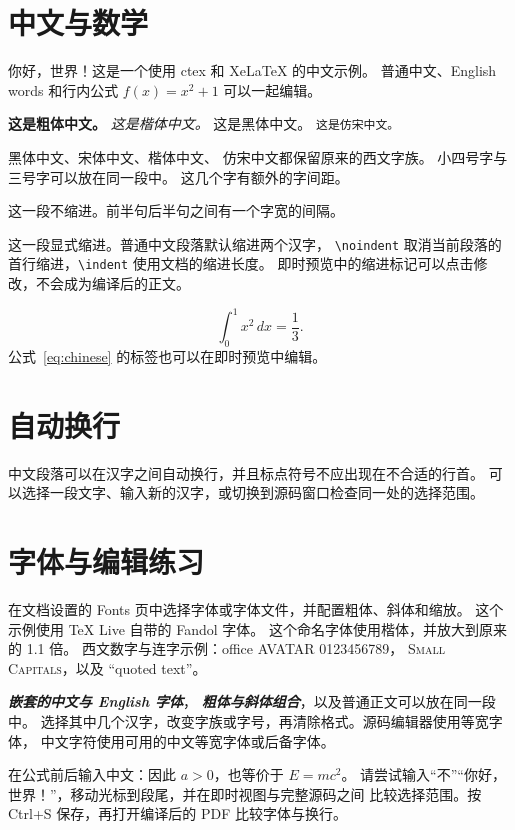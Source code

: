 \documentclass{article}
\begin{document}
\section{中文与数学}
你好，世界！这是一个使用 ctex 和 Xe\LaTeX{} 的中文示例。
普通中文、English words 和行内公式 $f(x)=x^2+1$ 可以一起编辑。

\textbf{这是粗体中文。} \textit{这是楷体中文。}
\textsf{这是黑体中文。} \texttt{这是仿宋中文。}

{\heiti 黑体中文}、{\songti 宋体中文}、{\kaishu 楷体中文}、
{\fangsong 仿宋中文}都保留原来的西文字族。
{小四号字}与{三号字}可以放在同一段中。
{这几个字有额外的字间距。}

\noindent 这一段不缩进。前半句\hspace{1em}后半句之间有一个字宽的间隔。

\indent 这一段显式缩进。普通中文段落默认缩进两个汉字，
\verb|\noindent| 取消当前段落的首行缩进，\verb|\indent| 使用文档的缩进长度。
即时预览中的缩进标记可以点击修改，不会成为编译后的正文。

\begin{equation}\label{eq:chinese}
  \int_0^1 x^2\,dx=\frac{1}{3}.
\end{equation}
公式~\eqref{eq:chinese} 的标签也可以在即时预览中编辑。

\section{自动换行}
中文段落可以在汉字之间自动换行，并且标点符号不应出现在不合适的行首。
可以选择一段文字、输入新的汉字，或切换到源码窗口检查同一处的选择范围。

\section{字体与编辑练习}
在文档设置的 Fonts 页中选择字体或字体文件，并配置粗体、斜体和缩放。
这个示例使用 \TeX{} Live 自带的 Fandol 字体。
{\examplekai 这个命名字体使用楷体，并放大到原来的 1.1 倍。}
{\examplelatin 西文数字与连字示例：office AVATAR 0123456789，
\textsc{Small Capitals}，以及 ``quoted text''。}

\textsf{\textit{\textbf{嵌套的中文与 English 字体}}}，
\textbf{\textit{粗体与斜体组合}}，以及普通正文可以放在同一段中。
选择其中几个汉字，改变字族或字号，再清除格式。源码编辑器使用等宽字体，
中文字符使用可用的中文等宽字体或后备字体。

在公式前后输入中文：因此 $a>0$，也等价于 $E=mc^2$。
请尝试输入“不”“你好，世界！”，移动光标到段尾，并在即时视图与完整源码之间
比较选择范围。按 Ctrl+S 保存，再打开编译后的 PDF 比较字体与换行。
\end{document}
